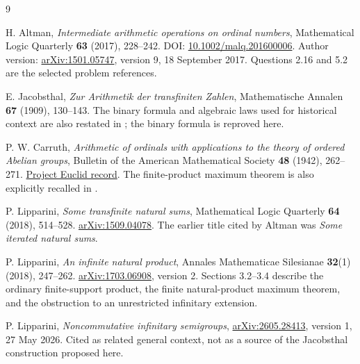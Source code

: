 \documentclass[11pt,letterpaper]{article}
\theoremstyle{definition}
\theoremstyle{remark}
\begin{document}
\clearpage
{}
{}
\begin{thebibliography}{9}

H. Altman,
\emph{Intermediate arithmetic operations on ordinal numbers},
Mathematical Logic Quarterly \textbf{63} (2017), 228--242.
DOI: \href{https://doi.org/10.1002/malq.201600006}{10.1002/malq.201600006}.
Author version: \href{https://arxiv.org/abs/1501.05747}{arXiv:1501.05747},
version 9, 18 September 2017. Questions 2.16 and 5.2 are the selected
problem references.

E. Jacobsthal,
\emph{Zur Arithmetik der transfiniten Zahlen},
Mathematische Annalen \textbf{67} (1909), 130--143.
The binary formula and algebraic laws used for historical context are
also restated in \cite{altman}; the binary formula is reproved here.

P. W. Carruth,
\emph{Arithmetic of ordinals with applications to the theory of ordered
Abelian groups},
Bulletin of the American Mathematical Society \textbf{48} (1942), 262--271.
\href{https://projecteuclid.org/journals/bulletin-of-the-american-mathematical-society/volume-48/issue-4/Arithmetic-of-ordinals-with-applications-to-the-theory-of-ordered/bams/1183504256.full}{Project Euclid record}.
The finite-product maximum theorem is also explicitly recalled in
\cite[Section~3.3]{lip-product}.

P. Lipparini,
\emph{Some transfinite natural sums},
Mathematical Logic Quarterly \textbf{64} (2018), 514--528.
\href{https://arxiv.org/abs/1509.04078}{arXiv:1509.04078}.
The earlier title cited by Altman was \emph{Some iterated natural sums}.

P. Lipparini,
\emph{An infinite natural product},
Annales Mathematicae Silesianae \textbf{32}(1) (2018), 247--262.
\href{https://arxiv.org/abs/1703.06908}{arXiv:1703.06908}, version 2.
Sections 3.2--3.4 describe the ordinary finite-support product, the
finite natural-product maximum theorem, and the obstruction to an
unrestricted infinitary extension.

P. Lipparini,
\emph{Noncommutative infinitary semigroups},
\href{https://arxiv.org/abs/2605.28413}{arXiv:2605.28413},
version 1, 27 May 2026.
Cited as related general context, not as a source of the Jacobsthal
construction proposed here.

\end{thebibliography}
\end{document}
